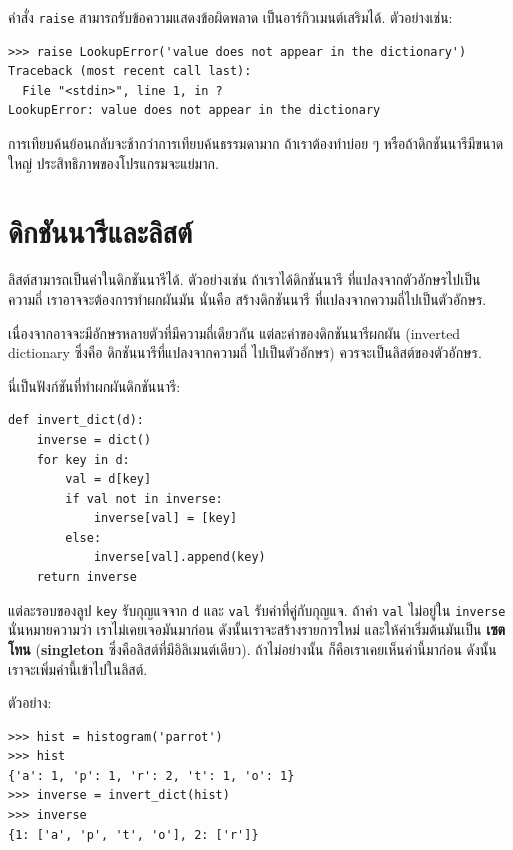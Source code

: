 คำสั่ง \texttt{raise} สามารถรับข้อความแสดงข้อผิดพลาด เป็นอาร์กิวเมนต์เสริมได้.
ตัวอย่างเช่น:

\begin{verbatim}
>>> raise LookupError('value does not appear in the dictionary')
Traceback (most recent call last):
  File "<stdin>", line 1, in ?
LookupError: value does not appear in the dictionary
\end{verbatim}
%
การเทียบค้นย้อนกลับจะช้ากว่าการเทียบค้นธรรมดามาก
ถ้าเราต้องทำบ่อย ๆ หรือถ้าดิกชันนารีมีขนาดใหญ่
ประสิทธิภาพของโปรแกรมจะแย่มาก.


\section{ดิกชันนารีและลิสต์}
\label{invert}

ลิสต์สามารถเป็นค่าในดิกชันนารีได้.
ตัวอย่างเช่น
ถ้าเราได้ดิกชันนารี ที่แปลงจากตัวอักษรไปเป็นความถี่
เราอาจจะต้องการทำผกผันมัน นั่นคือ สร้างดิกชันนารี
ที่แปลงจากความถี่ไปเป็นตัวอักษร.

เนื่องจากอาจจะมีอักษรหลายตัวที่มีความถี่เดียวกัน
แต่ละค่าของดิกชันนารีผกผัน (inverted dictionary ซึ่งคือ ดิกชันนารีที่แปลงจากความถี่ ไปเป็นตัวอักษร)
ควรจะเป็นลิสต์ของตัวอักษร.


นี่เป็นฟังก์ชันที่ทำผกผันดิกชันนารี:

\begin{verbatim}
def invert_dict(d):
    inverse = dict()
    for key in d:
        val = d[key]
        if val not in inverse:
            inverse[val] = [key]
        else:
            inverse[val].append(key)
    return inverse
\end{verbatim}
%
แต่ละรอบของลูป \texttt{key} รับกุญแจจาก \texttt{d} และ \texttt{val} รับค่าที่คู่กับกุญแจ.
ถ้าค่า \texttt{val} ไม่อยู่ใน \texttt{inverse} นั่นหมายความว่า
เราไม่เคยเจอมันมาก่อน ดังนั้นเราจะสร้างรายการใหม่ และให้ค่าเริ่มต้นมันเป็น \textbf{เซตโทน} (\textbf{singleton} ซึ่งคือลิสต์ที่มีอิลิเมนต์เดียว).
ถ้าไม่อย่างนั้น ก็คือเราเคยเห็นค่านี้มาก่อน
ดังนั้นเราจะเพิ่มค่านี้เข้าไปในลิสต์.  

ตัวอย่าง:

\begin{verbatim}
>>> hist = histogram('parrot')
>>> hist
{'a': 1, 'p': 1, 'r': 2, 't': 1, 'o': 1}
>>> inverse = invert_dict(hist)
>>> inverse
{1: ['a', 'p', 't', 'o'], 2: ['r']}
\end{verbatim}

